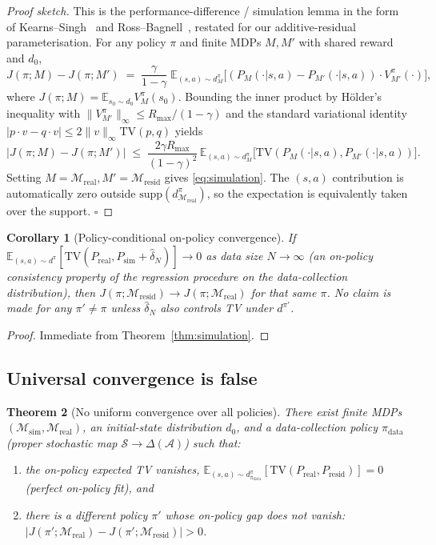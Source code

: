 \documentclass{article}
\newtheorem{theorem}{Theorem}
\newtheorem{corollary}[theorem]{Corollary}
\theoremstyle{definition}
\newcommand{\Msim}{\mathcal{M}_{\mathrm{sim}}}
\newcommand{\Mreal}{\mathcal{M}_{\mathrm{real}}}
\newcommand{\Mresid}{\mathcal{M}_{\mathrm{resid}}}
\newcommand{\Psim}{P_{\mathrm{sim}}}
\newcommand{\Preal}{P_{\mathrm{real}}}
\newcommand{\Presid}{P_{\mathrm{resid}}}
\newcommand{\Rmax}{R_{\max}}
\newcommand{\supp}{\mathrm{supp}}
\newcommand{\dpi}{d^{\pi}}
\newcommand{\pidata}{\pi_{\mathrm{data}}}
\begin{document}
\begin{proof}[Proof sketch]  This is the performance-difference / simulation
lemma in the form of Kearns--Singh~\cite{kearns-singh-2002} and
Ross--Bagnell~\cite{ross-bagnell-2012}, restated for our additive-residual
parameterisation.  For any policy $\pi$ and finite MDPs $M,M'$ with shared
reward and $d_0$,
\[
J(\pi;M)-J(\pi;M')
\;=\; \frac{\gamma}{1-\gamma}\;\mathbb E_{(s,a)\sim d^\pi_M}\!
   \bigl[(P_M(\cdot|s,a)-P_{M'}(\cdot|s,a))\cdot V^\pi_{M'}(\cdot)\bigr],
\]
where $J(\pi;M)=\mathbb E_{s_0\sim d_0}V^\pi_M(s_0)$.  Bounding the inner
product by H\"older's inequality with $\|V^\pi_{M'}\|_\infty\le\Rmax/(1-\gamma)$
and the standard variational identity $|p\cdot v - q\cdot v|\le2\|v\|_\infty\mathrm{TV}(p,q)$
yields
\[
|J(\pi;M)-J(\pi;M')|
\;\le\;\frac{2\gamma\Rmax}{(1-\gamma)^2}\,
   \mathbb E_{(s,a)\sim d^\pi_M}\!\bigl[\mathrm{TV}(P_M(\cdot|s,a),P_{M'}(\cdot|s,a))\bigr].
\]
Setting $M=\Mreal,M'=\Mresid$ gives \eqref{eq:simulation}.  The $(s,a)$
contribution is automatically zero outside $\supp(\dpi_{\Mreal})$, so the
expectation is equivalently taken over the support.  $\square$
\end{proof}

\begin{corollary}[Policy-conditional on-policy convergence]
\label{thm:policy-cond-conv}
If $\mathbb E_{(s,a)\sim\dpi}[\mathrm{TV}(\Preal,\Psim+\hat\delta_N)]\to 0$
as data size $N\to\infty$ (an on-policy consistency property of the
regression procedure on the data-collection distribution), then
$J(\pi;\Mresid)\to J(\pi;\Mreal)$ for that same $\pi$.  No claim is
made for any $\pi'\ne\pi$ unless $\hat\delta_N$ also controls TV under
$d^{\pi'}$.
\end{corollary}

\begin{proof}  Immediate from Theorem~\ref{thm:simulation}.
\end{proof}

\subsection{Universal convergence is false}

\begin{theorem}[No uniform convergence over all policies]
\label{thm:universal-false}
There exist finite MDPs $(\Msim,\Mreal)$, an initial-state distribution
$d_0$, and a data-collection policy $\pidata$ (proper stochastic map
$\mathcal S\to\Delta(\mathcal A)$) such that:
\begin{enumerate}
  \item the on-policy expected TV vanishes,
        $\mathbb E_{(s,a)\sim\dpi_{\pidata}}[\mathrm{TV}(\Preal,\Presid)]=0$
        (perfect on-policy fit), \emph{and}
  \item there is a different policy $\pi'$ whose on-policy gap does not
        vanish: $|J(\pi';\Mreal)-J(\pi';\Mresid)| > 0$.
\end{enumerate}
\end{theorem}
\end{document}
